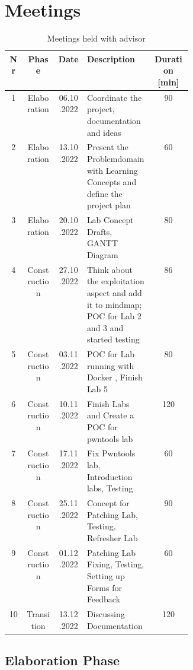 \chapter*{Meetings}
\label{meeting_chapter}

\begin{table}[H]
    \centering
    \begin{tabular}{| c | c | c | p{0.36\linewidth} | c |}
        \hline 
        Nr & Phase & Date & Description & Duration [min]\\
        \hline \hline
        1 & Elaboration & 06.10.2022 & Coordinate the project, documentation \- and ideas & 90\\
        \hline
        2 & Elaboration & 13.10.2022 & Present the Problemdomain with Learning Concepts and define the project plan & 60 \\
        \hline
        3 & Elaboration & 20.10.2022 & Lab Concept Drafts, GANTT Diagram & 80 \\
        \hline
        4 & Construction & 27.10.2022 & Think about the exploitation aspect and add it to mindmap; POC for Lab 2 and 3 and started testing & 86\\
        \hline
        5 & Construction & 03.11.2022 & POC for Lab running with Docker , Finish Lab 5 & 80 \\
        \hline
        6 & Construction & 10.11.2022 & Finish Labs and Create a POC for pwntools lab & 120 \\
        \hline
        7 & Construction & 17.11.2022 & Fix Pwntools lab, Introduction labs, Testing & 60 \\
        \hline
        8 & Construction & 25.11.2022 & Concept for Patching Lab, Testing, Refresher Lab & 90 \\
        \hline
        9 & Construction & 01.12.2022 & Patching Lab Fixing, Testing, Setting up Forms for Feedback & 60 \\
        \hline
        10 & Transition & 13.12.2022 & Discussing Documentation & 120 \\
        \hline
    \end{tabular}
    \caption{Meetings held with advisor}
    \label{meetings_hold_table}
\end{table}

\newpage
\section*{Elaboration Phase}
